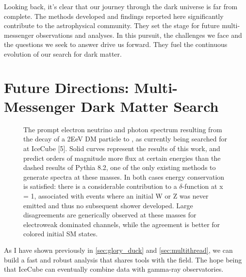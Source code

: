 Looking back, it's clear that our journey through the dark universe is far from complete. The methods developed and findings reported here significantly contribute to the astrophysical community. They set the stage for future multi-messenger observations and analyses. In this pursuit, the challenges we face and the questions we seek to answer drive us forward. They fuel the continuous evolution of our search for dark matter.

\section{Future Directions: Multi-Messenger Dark Matter Search}\label{sec:future}

\begin{figure}[h]
    \caption{The prompt electron neutrino and photon spectrum resulting from the decay of a 2EeV DM particle to , as currently being searched for at IceCube [5]. Solid curves represent the results of this work, and predict orders of magnitude more flux at certain energies than the dashed results of Pythia 8.2, one of the only existing methods to generate spectra at these masses. In both cases energy conservation is satisfied: there is a considerable contribution to a $\delta$-function at x = 1, associated with events where an initial W or Z was never emitted and thus no subsequent shower developed. Large disagreements are generically observed at these masses for electroweak dominated channels, while the agreement is better for colored initial SM states.}
    \label{fig:nu_and_gam}
\end{figure}

As I have shown previously in \cref{sec:glory_duck} and \cref{sec:multithread}, we can build a fast and robust analysis that shares tools with the field.
The hope being that IceCube can eventually combine data with gamma-ray observatories.
